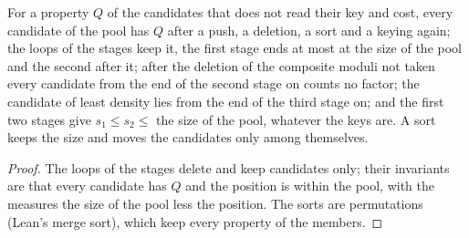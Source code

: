 \begin{lemma}\label{lem:choicePool}
  \leanok
  For a property $Q$ of the candidates that does not read their key and cost, every candidate of the
  pool has $Q$ after a push, a deletion, a sort and a keying again; the loops of the stages keep it,
  the first stage ends at most at the size of the pool and the second after it; after the deletion
  of the composite moduli not taken every candidate from the end of the second stage on counts no
  factor; the candidate of least density lies from the end of the third stage on; and the first two
  stages give $s_1 \le s_2 \le$ the size of the pool, whatever the keys are. A sort keeps the size
  and moves the candidates only among themselves.
\end{lemma}

\begin{proof}
  \leanok
  The loops of the stages delete and keep candidates only; their invariants are that every candidate
  has $Q$ and the position is within the pool, with the measures the size of the pool less the
  position. The sorts are permutations (Lean's merge sort), which keep every property of the
  members.
\end{proof}

